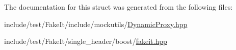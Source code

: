 The documentation for this struct was generated from the following files\+:\begin{DoxyCompactItemize}
\item 
include/test/\+Fake\+It/include/mockutils/\mbox{\hyperlink{DynamicProxy_8hpp}{Dynamic\+Proxy.\+hpp}}\item 
include/test/\+Fake\+It/single\+\_\+header/boost/\mbox{\hyperlink{single__header_2boost_2fakeit_8hpp}{fakeit.\+hpp}}\end{DoxyCompactItemize}
